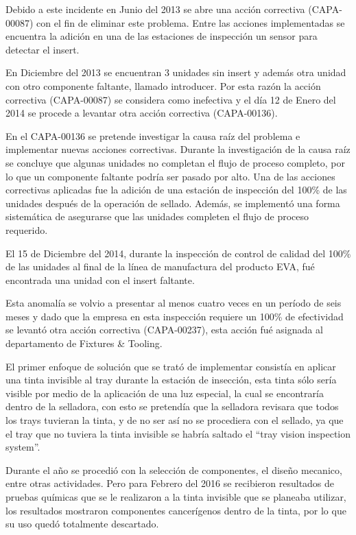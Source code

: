 Debido a este incidente en Junio del 2013 se abre una acci\'on correctiva (CAPA-00087) con el fin de eliminar este problema. Entre las acciones implementadas se encuentra la adici\'on en una de las estaciones de inspecci\'on un sensor para detectar el insert.

En Diciembre del 2013 se encuentran 3 unidades sin insert y adem\'as otra unidad con otro componente faltante, llamado introducer. Por esta raz\'on la acci\'on correctiva (CAPA-00087) se considera como inefectiva y el d\'ia 12 de Enero del 2014 se procede a levantar otra acci\'on correctiva (CAPA-00136).

En el CAPA-00136 se pretende investigar la causa ra\'iz del problema e implementar nuevas
acciones correctivas. Durante la investigaci\'on de la causa ra\'iz se concluye que algunas
unidades no completan el flujo de proceso completo, por lo que un componente faltante
podr\'ia ser pasado por alto. Una de las acciones correctivas aplicadas fue la adici\'on de
una estaci\'on de inspecci\'on del 100\% de las unidades despu\'es de la operaci\'on de sellado. Adem\'as, se implement\'o una forma sistem\'atica de asegurarse que las unidades completen el flujo de proceso requerido.

El 15 de Diciembre del 2014, durante la inspecci\'on de control de calidad del 100\% de
las unidades al final de la l\'inea de manufactura del producto EVA, fu\'e encontrada una
unidad con el insert faltante.

Esta anomalía se volvio a presentar al menos cuatro veces en un per\'iodo de seis meses y dado que la empresa en esta inspecci\'on requiere un 100\% de efectividad se levant\'o otra acci\'on correctiva (CAPA-00237), esta acci\'on fu\'e asignada al departamento de Fixtures \& Tooling.

El primer enfoque de soluci\'on que se trat\'o de implementar consist\'ia en aplicar una tinta invisible al tray durante la estaci\'on de insecci\'on,
esta tinta s\'olo ser\'ia visible por medio de la aplicaci\'on de una luz especial, la cual se encontrar\'ia dentro de la selladora,
con esto se pretend\'ia que la selladora revisara que todos los trays tuvieran la tinta, y de no ser as\'i no se procediera
con el sellado, ya que el tray que no tuviera la tinta invisible se habr\'ia saltado el \enquote{tray vision inspection system}.

Durante el a\~no se procedi\'o con la selecci\'on de componentes, el dise\~no mecanico, entre otras actividades.
Pero para Febrero del 2016 se recibieron resultados de pruebas qu\'imicas que se le realizaron a la tinta invisible que se planeaba
utilizar, los resultados mostraron componentes cancer\'igenos dentro de la tinta, por lo que su uso qued\'o totalmente descartado.


